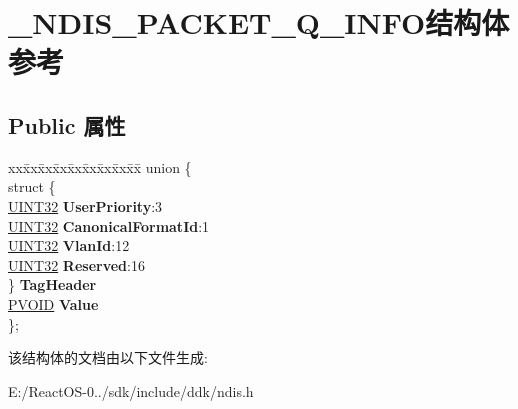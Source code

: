 \hypertarget{struct___n_d_i_s___p_a_c_k_e_t__8021_q___i_n_f_o}{}\section{\+\_\+\+N\+D\+I\+S\+\_\+\+P\+A\+C\+K\+E\+T\+\_\+Q\+\_\+\+I\+N\+F\+O结构体 参考}
\label{struct___n_d_i_s___p_a_c_k_e_t__8021_q___i_n_f_o}
\subsection*{Public 属性}
\begin{DoxyCompactItemize}
\item 
\mbox{\label{struct___n_d_i_s___p_a_c_k_e_t__8021_q___i_n_f_o_a7838016caf240f6398ebcb74f79c5aba}} 
\begin{tabbing}
xx\=xx\=xx\=xx\=xx\=xx\=xx\=xx\=xx\=\kill
union \{\\
\>struct \{\\
\>\>\hyperlink{_processor_bind_8h_ae1e6edbbc26d6fbc71a90190d0266018}{UINT32} {\bfseries UserPriority}:3\\
\>\>\hyperlink{_processor_bind_8h_ae1e6edbbc26d6fbc71a90190d0266018}{UINT32} {\bfseries CanonicalFormatId}:1\\
\>\>\hyperlink{_processor_bind_8h_ae1e6edbbc26d6fbc71a90190d0266018}{UINT32} {\bfseries VlanId}:12\\
\>\>\hyperlink{_processor_bind_8h_ae1e6edbbc26d6fbc71a90190d0266018}{UINT32} {\bfseries Reserved}:16\\
\>\} {\bfseries TagHeader}\\
\>\hyperlink{interfacevoid}{PVOID} {\bfseries Value}\\
\}; \\

\end{tabbing}\end{DoxyCompactItemize}


该结构体的文档由以下文件生成\+:\begin{DoxyCompactItemize}
\item 
E\+:/\+React\+O\+S-\/0../sdk/include/ddk/ndis.\+h\end{DoxyCompactItemize}
